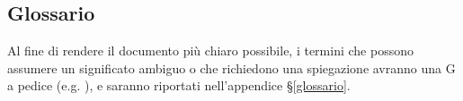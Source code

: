 \subsection{Glossario}

Al fine di rendere il documento più chiaro possibile, i termini che possono assumere un significato ambiguo o che richiedono una spiegazione avranno
una G a pedice (e.g. ), e saranno riportati nell'appendice \S\ref{glossario}.
